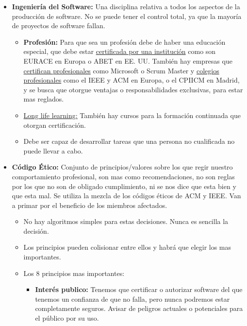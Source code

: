 \documentclass[12pt, twoside, openright]{report} %
\begin{document}
\begin{itemize}
\begin{itemize}
  \end{itemize}
\item \textbf{Ingeniería del Software:} Una disciplina relativa a todos los
  aspectos de la producción de software. No se puede tener el control
  total, ya que la mayoría de proyectos de software fallan.
  

  \begin{itemize}
  \item \textbf{Profesión:} Para que sea un profesión debe de haber una
    educación especial, que debe estar \underline{certificada por una
    institución} como son EURACE en Europa o ABET en EE. UU. También hay
    empresas que \underline{certifican profesionales} como Microsoft o
    Scrum Master y \underline{colegios profesionales} como el IEEE y ACM
    en Europa, o el CPIICM en Madrid, y se busca que otorgue ventajas o
    responsabilidades exclusivas, para estar mas reglados.
    
  \item \underline{Long life learning:} También hay cursos para la formación
    continuada que otorgan certificación.
    
  \item Debe ser capaz de desarrollar tareas que una persona no cualificada
    no puede llevar a cabo.
    
  \end{itemize}
\item \textbf{Código Ético:} Conjunto de principios/valores sobre los que
  regir nuestro comportamiento profesional, son mas como
  recomendaciones, no son reglas por los que no son de obligado
  cumplimiento, ni se nos dice que esta bien y que esta mal. Se utiliza
  la mezcla de los códigos éticos de ACM y IEEE. Van a primar por el
  beneficio de los miembros afectados.
  

  \begin{itemize}
  \item No hay algoritmos simples para estas decisiones. Nunca es sencilla
    la decisión.
    
  \item Los principios pueden colisionar entre ellos y habrá que elegir los
    mas importantes.
    
  \item Los 8 principios mas importantes:
    

    \begin{itemize}
    \item \textbf{Interés publico:} Tenemos que certificar o autorizar
      software del que tenemos un confianza de que no falla, pero nunca
      podremos estar completamente seguros. Avisar de peligros actuales
      o potenciales para el público por su uso.
      

\end{itemize}
\end{itemize}
\end{itemize}
\end{document}
